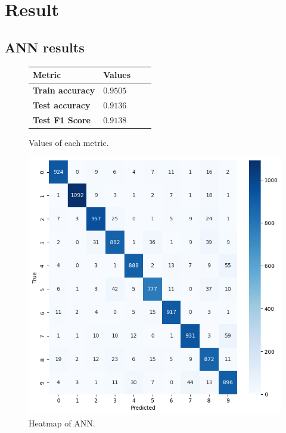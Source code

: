 \section{Result}

\subsection{ANN results}
\begin{figure}[H]
    \centering
    \begin{tabular}{|l|l|l|l|}
        \hline
        \rowcolor{gray!50}
        Metric & Values   \\ \hline
        \textbf{Train accuracy} & $0.9505$ \\ \hline
        \textbf{Test accuracy} & $0.9136$ \\ \hline
        \textbf{Test F1 Score} & $0.9138$ \\ \hline
    \end{tabular}
    \caption{Values of each metric.}
\end{figure}

\begin{figure}[H]
    \centering
    \includegraphics[scale=0.55]{src/figs/heatmapANN.png}
    \caption{Heatmap of ANN.}
    \label{fig:ANNheatmap}
\end{figure}


